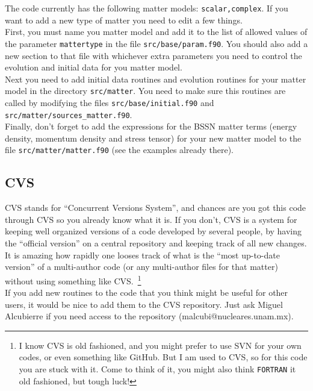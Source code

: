 \documentclass[12pt]{article}
\begin{document}
The code currently has the following matter models: \texttt{scalar,complex}.
If you want to add a new type of matter you need to edit a few things. \\

First, you must name you matter model and add it to the list of
allowed values of the parameter \texttt{mattertype} in the file
\texttt{src/base/param.f90}.  You should also add a new section to that file
with whichever extra parameters you need to control the evolution
and initial data for you matter model. \\

Next you need to add initial data routines and evolution routines for
your matter model in the directory \texttt{src/matter}.  You need to
make sure this routines are called by modifying the files
\texttt{src/base/initial.f90} and
\texttt{src/matter/sources\_matter.f90}. \\

Finally, don't forget to add the expressions for the BSSN matter terms
(energy density, momentum density and stress tensor) for your new
matter model to the file \texttt{src/matter/matter.f90} (see the
examples already there). \\


\subsection{CVS}

CVS stands for ``Concurrent Versions System'', and chances are you got
this code through CVS so you already know what it is.  If you don't,
CVS is a system for keeping well organized versions of a code
developed by several people, by having the ``official version'' on a
central repository and keeping track of all new changes. It is amazing
how rapidly one looses track of what is the ``most up-to-date
version'' of a multi-author code (or any multi-author files for that
matter) without using something like CVS.~\footnote{I know CVS is old
  fashioned, and you might prefer to use SVN for your own codes, or
  even something like GitHub. But I am used to CVS, so for this code
  you are stuck with it. Come to think of it, you might also think
  \texttt{FORTRAN} it old fashioned, but tough luck!} \\

If you add new routines to the code that you think might be useful for
other users, it would be nice to add them to the CVS repository.  Just
ask Miguel Alcubierre if you need access to the repository
(malcubi@nucleares.unam.mx). \\
\end{document}
